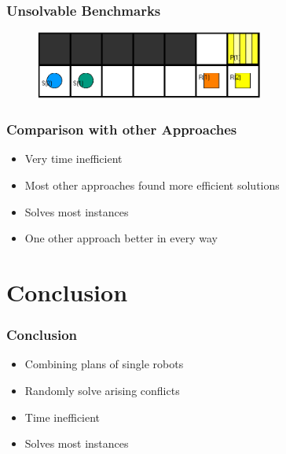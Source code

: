\documentclass{beamer}
\begin{document}
\begin{frame}
\frametitle{Unsolvable Benchmarks}
\begin{figure}
\includegraphics[width=75mm]{Images/Instance 3}
\end{figure}
\end{frame}

\begin{frame}
\frametitle{Comparison with other Approaches}
\begin{itemize}
\item<2-> Very time inefficient
\medskip
\item<3-> Most other approaches found more efficient solutions
\medskip
\item<4-> Solves most instances
\medskip
\item<5-> One other approach better in every way
\end{itemize}
\end{frame}

\section{Conclusion}
\begin{frame}
\frametitle{Conclusion}
\begin{itemize}
\item<2-> Combining plans of single robots
\medskip
\item<3-> Randomly solve arising conflicts
\medskip
\item<4-> Time inefficient
\medskip
\item<5-> Solves most instances
\end{itemize}
\end{frame}
\end{document}
